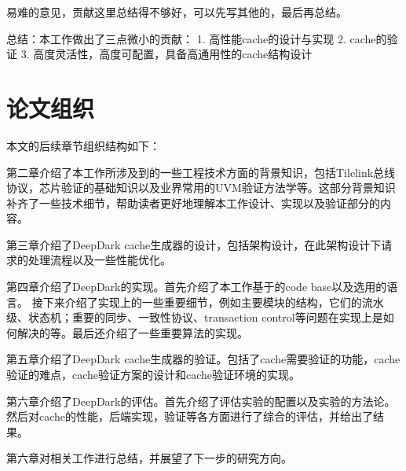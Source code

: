   易难的意见，贡献这里总结得不够好，可以先写其他的，最后再总结。

总结：本工作做出了三点微小的贡献：
1. 高性能cache的设计与实现
2. cache的验证
3. 高度灵活性，高度可配置，具备高通用性的cache结构设计

\section{论文组织}

本文的后续章节组织结构如下：

第二章介绍了本工作所涉及到的一些工程技术方面的背景知识，包括Tilelink总线协议，芯片验证的基础知识以及业界常用的UVM验证方法学等。这部分背景知识补齐了一些技术细节，帮助读者更好地理解本工作设计、实现以及验证部分的内容。

第三章介绍了DeepDark cache生成器的设计，包括架构设计，在此架构设计下请求的处理流程以及一些性能优化。

第四章介绍了DeepDark的实现。首先介绍了本工作基于的code base以及选用的语言。 接下来介绍了实现上的一些重要细节，例如主要模块的结构，它们的流水级、状态机；重要的同步、一致性协议、transaction control等问题在实现上是如何解决的等。最后还介绍了一些重要算法的实现。

第五章介绍了DeepDark cache生成器的验证。包括了cache需要验证的功能，cache验证的难点，cache验证方案的设计和cache验证环境的实现。

第六章介绍了DeepDark的评估。首先介绍了评估实验的配置以及实验的方法论。然后对cache的性能，后端实现，验证等各方面进行了综合的评估，并给出了结果。

第六章对相关工作进行总结，并展望了下一步的研究方向。
